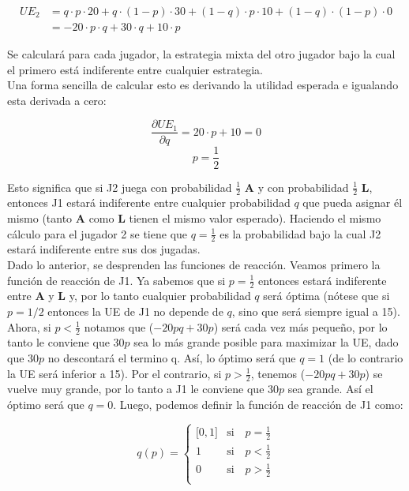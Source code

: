 \documentclass{exam}
\begin{document}
\begin{enumerate}[resume*]
\begin{solution}
\begin{align*}
  UE_2 &= q \cdot p \cdot 20 + q \cdot (1-p) \cdot 30 + (1-q)\cdot p \cdot 10 + (1-q) \cdot (1-p) \cdot 0 \\
    &= -20\cdot p \cdot q +30 \cdot q + 10\cdot p
\end{align*}

Se calculará para cada jugador, la estrategia mixta del otro jugador bajo la cual el primero está indiferente entre cualquier estrategia.\\

Una forma sencilla de calcular esto es derivando la utilidad esperada e igualando esta derivada a cero:

$$\frac{\partial UE_1}{\partial q}= 20\cdot p + 10 = 0$$
$$p=\frac{1}{2}$$

Esto significa que si J2 juega con probabilidad $\frac{1}{2}$ \textbf{A} y con probabilidad $\frac{1}{2}$ \textbf{L}, entonces J1 estará indiferente entre cualquier probabilidad $q$ que pueda asignar él mismo (tanto \textbf{A} como \textbf{L} tienen el mismo valor
esperado). Haciendo el mismo cálculo para el jugador 2 se tiene que $q=\frac{1}{2}$ es la probabilidad bajo la cual J2 estará indiferente entre sus dos jugadas.\\

Dado lo anterior, se desprenden las funciones de reacción. Veamos primero la función de reacción de J1. Ya sabemos que si $p=\frac{1}{2}$ entonces estará indiferente entre \textbf{A} y \textbf{L} y, por lo tanto cualquier probabilidad $q$ será óptima (nótese que si $p=1/2$ entonces la UE de J1 no depende de $q$, sino que será siempre igual a 15). Ahora, si $p<\frac{1}{2}$ notamos que ($-20pq+30p$) será cada vez más pequeño, por lo tanto le conviene que $30p$ sea lo más grande posible para maximizar la UE, dado que $30p$ no descontará el termino q. Así, lo óptimo será que $q=1$ (de lo contrario la UE será inferior a 15). Por el contrario, si $p>\frac{1}{2}$, tenemos ($-20pq+30p$) se vuelve muy grande, por lo tanto a J1 le conviene que $30p$ sea grande. Así el óptimo será que $q=0$. Luego, podemos definir la función de reacción de J1 como:

\begin{equation}
             q(p)= \left\{ \begin{array}{ll}
             {[}0,1{]} &  \text{si} \quad p = \frac{1}{2} \\
             1 & \text{si} \quad p<\frac{1}{2}\\
             0 & \text{si} \quad p>\frac{1}{2}\\
             

\end{array}
\end{equation}
\end{solution}
\end{enumerate}
\end{document}
